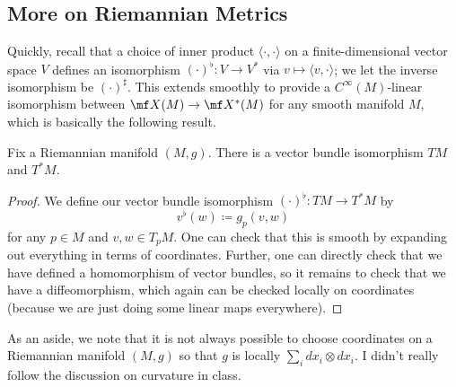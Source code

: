 \documentclass[../notes.tex]{subfiles}
\begin{document}
\subsection{More on Riemannian Metrics}
Quickly, recall that a choice of inner product $\langle\cdot,\cdot\rangle$ on a finite-dimensional vector space $V$ defines an isomorphism $(\cdot)^\flat\colon V\to V^*$ via $v\mapsto\langle v,\cdot\rangle$; we let the inverse isomorphism be $(\cdot)^\sharp$. This extends smoothly to provide a $C^\infty(M)$-linear isomorphism between $\mf X(M)\to\mf X^*(M)$ for any smooth manifold $M$, which is basically the following result.
\begin{proposition}
	Fix a Riemannian manifold $(M,g)$. There is a vector bundle isomorphism $TM$ and $T^*M$.
\end{proposition}
\begin{proof}
	We define our vector bundle isomorphism $(\cdot)^\flat\colon TM\to T^*M$ by
	\[v^\flat(w)\coloneqq g_p(v,w)\]
	for any $p\in M$ and $v,w\in T_pM$. One can check that this is smooth by expanding out everything in terms of coordinates. Further, one can directly check that we have defined a homomorphism of vector bundles, so it remains to check that we have a diffeomorphism, which again can be checked locally on coordinates (because we are just doing some linear maps everywhere).
\end{proof}
As an aside, we note that it is not always possible to choose coordinates on a Riemannian manifold $(M,g)$ so that $g$ is locally $\sum_idx_i\otimes dx_i$. I didn't really follow the discussion on curvature in class.
\end{document}
